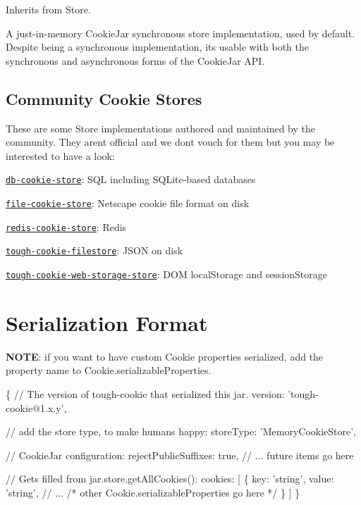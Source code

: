 Inherits from {\ttfamily Store}.

A just-\/in-\/memory Cookie\+Jar synchronous store implementation, used by default. Despite being a synchronous implementation, it\textquotesingle{}s usable with both the synchronous and asynchronous forms of the {\ttfamily Cookie\+Jar} A\+PI.

\subsection*{Community Cookie Stores}

These are some Store implementations authored and maintained by the community. They aren\textquotesingle{}t official and we don\textquotesingle{}t vouch for them but you may be interested to have a look\+:


\begin{DoxyItemize}
\item \href{https://github.com/JSBizon/db-cookie-store}{\tt {\ttfamily db-\/cookie-\/store}}\+: S\+QL including S\+Q\+Lite-\/based databases
\item \href{https://github.com/JSBizon/file-cookie-store}{\tt {\ttfamily file-\/cookie-\/store}}\+: Netscape cookie file format on disk
\item \href{https://github.com/benkroeger/redis-cookie-store}{\tt {\ttfamily redis-\/cookie-\/store}}\+: Redis
\item \href{https://github.com/mitsuru/tough-cookie-filestore}{\tt {\ttfamily tough-\/cookie-\/filestore}}\+: J\+S\+ON on disk
\item \href{https://github.com/exponentjs/tough-cookie-web-storage-store}{\tt {\ttfamily tough-\/cookie-\/web-\/storage-\/store}}\+: D\+OM local\+Storage and session\+Storage
\end{DoxyItemize}

\section*{Serialization Format}

{\bfseries N\+O\+TE}\+: if you want to have custom {\ttfamily Cookie} properties serialized, add the property name to {\ttfamily Cookie.\+serializable\+Properties}.


\begin{DoxyCode}
\{
  // The version of tough-cookie that serialized this jar.
  version: 'tough-cookie@1.x.y',

  // add the store type, to make humans happy:
  storeType: 'MemoryCookieStore',

  // CookieJar configuration:
  rejectPublicSuffixes: true,
  // ... future items go here

  // Gets filled from jar.store.getAllCookies():
  cookies: [
    \{
      key: 'string',
      value: 'string',
      // ...
      /* other Cookie.serializableProperties go here */
    \}
  ]
\}
\end{DoxyCode}


